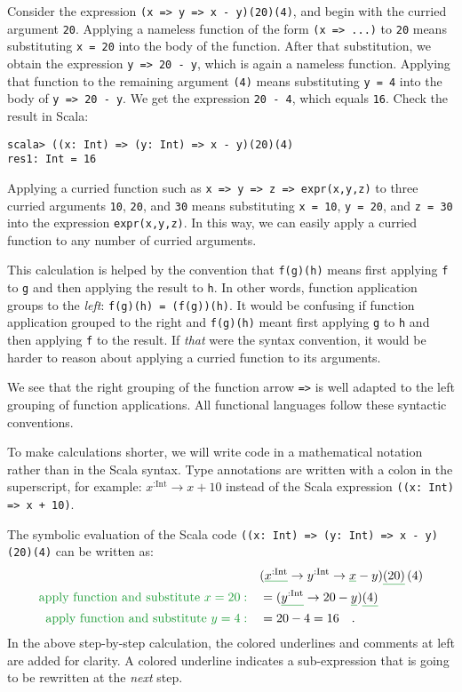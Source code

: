 Consider the expression \lstinline!(x => y => x - y)(20)(4)!, and
begin with the curried argument \lstinline!20!. Applying a nameless
function of the form \lstinline!(x => ...)! to \lstinline!20! means
substituting \lstinline!x = 20! into the body of the function. After
that substitution, we obtain the expression \lstinline!y => 20 - y!,
which is again a nameless function. Applying that function to the
remaining argument \lstinline!(4)! means substituting \lstinline!y = 4!
into the body of \lstinline!y => 20 - y!. We get the expression \lstinline!20 - 4!,
which equals \lstinline!16!. Check the result in Scala:
\begin{lstlisting}
scala> ((x: Int) => (y: Int) => x - y)(20)(4)
res1: Int = 16
\end{lstlisting}

Applying a curried function such as \lstinline!x => y => z => expr(x,y,z)!
to three curried arguments \lstinline!10!, \lstinline!20!, and \lstinline!30!
means substituting \lstinline!x = 10!, \lstinline!y = 20!, and \lstinline!z = 30!
into the expression \lstinline!expr(x,y,z)!. In this way, we can
easily apply a curried function to any number of curried arguments.

This calculation is helped by the convention that \lstinline!f(g)(h)!
means first applying \lstinline!f! to \lstinline!g! and then applying
the result to \lstinline!h!. In other words, function application
groups to the \emph{left}: \lstinline!f(g)(h) = (f(g))(h)!. It would
be confusing if function application grouped to the right and \lstinline!f(g)(h)!
meant first applying \lstinline!g! to \lstinline!h! and then applying
\lstinline!f! to the result. If \emph{that} were the syntax convention,
it would be harder to reason about applying a curried function to
its arguments.

We see that the right grouping of the function arrow \lstinline!=>!
is well adapted to the left grouping of function applications. All
functional languages follow these syntactic conventions.

To make calculations shorter, we will write code in a mathematical
notation rather than in the Scala syntax. Type annotations are written
with a colon in the superscript, for example: $x^{:\text{Int}}\rightarrow x+10$
instead of the Scala expression \lstinline!((x: Int) => x + 10)!.

The symbolic evaluation of the Scala code \lstinline!((x: Int) => (y: Int) => x - y)(20)(4)!
can be written as:
\begin{align*}
 & (\gunderline{x^{:\text{Int}}}\rightarrow y^{:\text{Int}}\rightarrow\gunderline x-y)\gunderline{\left(20\right)}\left(4\right)\\
{\color{greenunder}\text{apply function and substitute }x=20:}\quad & =(\gunderline{y^{:\text{Int}}}\rightarrow20-\gunderline y)\gunderline{\left(4\right)}\\
{\color{greenunder}\text{apply function and substitute }y=4:}\quad & =20-4=16\quad.
\end{align*}
In the above step-by-step calculation, the colored underlines and
comments at left are added for clarity. A colored underline indicates
a sub-expression that is going to be rewritten at the \emph{next}
step.

